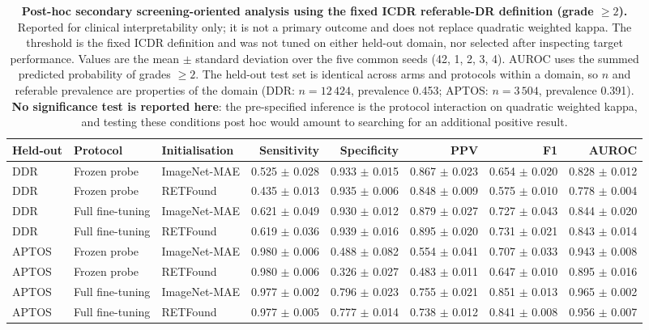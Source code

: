 \begin{table}[t]
\centering
\caption{\textbf{Post-hoc secondary screening-oriented analysis using the fixed ICDR referable-DR definition (grade $\geq 2$).} Reported for clinical interpretability only; it is not a primary outcome and does not replace quadratic weighted kappa. The threshold is the fixed ICDR definition and was not tuned on either held-out domain, nor selected after inspecting target performance. Values are the mean $\pm$ standard deviation over the five common seeds (42, 1, 2, 3, 4). AUROC uses the summed predicted probability of grades $\geq 2$. The held-out test set is identical across arms and protocols within a domain, so $n$ and referable prevalence are properties of the domain (DDR: $n=12\,424$, prevalence 0.453; APTOS: $n=3\,504$, prevalence 0.391). \textbf{No significance test is reported here}: the pre-specified inference is the protocol interaction on quadratic weighted kappa, and testing these conditions post hoc would amount to searching for an additional positive result.}
\label{tab:jbhi-referable-dr}
\begin{tabular}{lllrrrrr}
\toprule
Held-out & Protocol & Initialisation & Sensitivity & Specificity & PPV & F1 & AUROC \\
\midrule
DDR & Frozen probe & ImageNet-MAE & 0.525 $\pm$ 0.028 & 0.933 $\pm$ 0.015 & 0.867 $\pm$ 0.023 & 0.654 $\pm$ 0.020 & 0.828 $\pm$ 0.012 \\
DDR & Frozen probe & RETFound & 0.435 $\pm$ 0.013 & 0.935 $\pm$ 0.006 & 0.848 $\pm$ 0.009 & 0.575 $\pm$ 0.010 & 0.778 $\pm$ 0.004 \\
DDR & Full fine-tuning & ImageNet-MAE & 0.621 $\pm$ 0.049 & 0.930 $\pm$ 0.012 & 0.879 $\pm$ 0.027 & 0.727 $\pm$ 0.043 & 0.844 $\pm$ 0.020 \\
DDR & Full fine-tuning & RETFound & 0.619 $\pm$ 0.036 & 0.939 $\pm$ 0.016 & 0.895 $\pm$ 0.020 & 0.731 $\pm$ 0.021 & 0.843 $\pm$ 0.014 \\
APTOS & Frozen probe & ImageNet-MAE & 0.980 $\pm$ 0.006 & 0.488 $\pm$ 0.082 & 0.554 $\pm$ 0.041 & 0.707 $\pm$ 0.033 & 0.943 $\pm$ 0.008 \\
APTOS & Frozen probe & RETFound & 0.980 $\pm$ 0.006 & 0.326 $\pm$ 0.027 & 0.483 $\pm$ 0.011 & 0.647 $\pm$ 0.010 & 0.895 $\pm$ 0.016 \\
APTOS & Full fine-tuning & ImageNet-MAE & 0.977 $\pm$ 0.002 & 0.796 $\pm$ 0.023 & 0.755 $\pm$ 0.021 & 0.851 $\pm$ 0.013 & 0.965 $\pm$ 0.002 \\
APTOS & Full fine-tuning & RETFound & 0.977 $\pm$ 0.005 & 0.777 $\pm$ 0.014 & 0.738 $\pm$ 0.012 & 0.841 $\pm$ 0.008 & 0.956 $\pm$ 0.007 \\
\bottomrule
\end{tabular}
\end{table}
